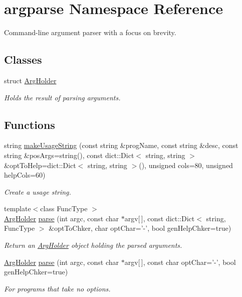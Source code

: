 \hypertarget{namespaceargparse}{\section{argparse Namespace Reference}
\label{namespaceargparse}
}


Command-\/line argument parser with a focus on brevity.  


\subsection*{Classes}
\begin{DoxyCompactItemize}
\item 
struct \hyperlink{structargparse_1_1_arg_holder}{Arg\-Holder}
\begin{DoxyCompactList}\small\item\em Holds the result of parsing arguments. \end{DoxyCompactList}\end{DoxyCompactItemize}
\subsection*{Functions}
\begin{DoxyCompactItemize}
\item 
string \hyperlink{namespaceargparse_a0ee3e8ca883816181b45c15a9ad0b6ed}{make\-Usage\-String} (const string \&prog\-Name, const string \&desc, const string \&pos\-Args=string(), const dict\-::\-Dict$<$ string, string $>$ \&opt\-To\-Help=dict\-::\-Dict$<$ string, string $>$(), unsigned cols=80, unsigned help\-Cols=60)
\begin{DoxyCompactList}\small\item\em Create a usage string. \end{DoxyCompactList}\item 
{\footnotesize template$<$class Func\-Type $>$ }\\\hyperlink{structargparse_1_1_arg_holder}{Arg\-Holder} \hyperlink{namespaceargparse_a4b1b6c03b45175acd13d1620f328e4aa}{parse} (int argc, const char $\ast$argv\mbox{[}$\,$\mbox{]}, const dict\-::\-Dict$<$ string, Func\-Type $>$ \&opt\-To\-Chker, char opt\-Char='-\/', bool gen\-Help\-Chker=true)
\begin{DoxyCompactList}\small\item\em Return an \hyperlink{structargparse_1_1_arg_holder}{Arg\-Holder} object holding the parsed arguments. \end{DoxyCompactList}\item 
\hyperlink{structargparse_1_1_arg_holder}{Arg\-Holder} \hyperlink{namespaceargparse_a6cfba06102a610840779069dfda1b98d}{parse} (int argc, const char $\ast$argv\mbox{[}$\,$\mbox{]}, const char opt\-Char='-\/', bool gen\-Help\-Chker=true)
\begin{DoxyCompactList}\small\item\em For programs that take no options. \end{DoxyCompactList}\end{DoxyCompactItemize}


